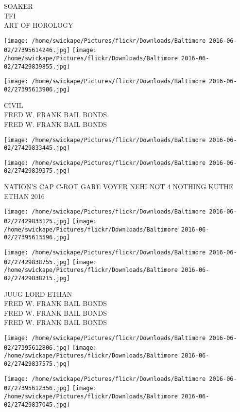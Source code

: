\documentclass[10pt,letterpaper]{article}
\begin{document}
SOAKER\\
TFI\\
ART OF HOROLOGY
\pagebreak

\texttt{[image: /home/swickape/Pictures/flickr/Downloads/Baltimore 2016-06-02/27395614246.jpg]}
\texttt{[image: /home/swickape/Pictures/flickr/Downloads/Baltimore 2016-06-02/27429839855.jpg]}

\vspace{0.25in}
\texttt{[image: /home/swickape/Pictures/flickr/Downloads/Baltimore 2016-06-02/27395613906.jpg]}

CIVIL\\
FRED W. FRANK BAIL BONDS\\
FRED W. FRANK BAIL BONDS
\pagebreak

\texttt{[image: /home/swickape/Pictures/flickr/Downloads/Baltimore 2016-06-02/27429833445.jpg]}

\vspace{0.25in}
\texttt{[image: /home/swickape/Pictures/flickr/Downloads/Baltimore 2016-06-02/27429839375.jpg]}

NATION'S CAP C{-}ROT GARE VOYER NEHI NOT 4 NOTHING KUTHE\\
ETHAN 2016
\pagebreak

\texttt{[image: /home/swickape/Pictures/flickr/Downloads/Baltimore 2016-06-02/27429833125.jpg]}
\texttt{[image: /home/swickape/Pictures/flickr/Downloads/Baltimore 2016-06-02/27395613596.jpg]}

\texttt{[image: /home/swickape/Pictures/flickr/Downloads/Baltimore 2016-06-02/27429838755.jpg]}
\texttt{[image: /home/swickape/Pictures/flickr/Downloads/Baltimore 2016-06-02/27429838215.jpg]}

JUUG LORD ETHAN\\
FRED W. FRANK BAIL BONDS\\
FRED W. FRANK BAIL BONDS\\
FRED W. FRANK BAIL BONDS
\pagebreak

\texttt{[image: /home/swickape/Pictures/flickr/Downloads/Baltimore 2016-06-02/27395612806.jpg]}
\texttt{[image: /home/swickape/Pictures/flickr/Downloads/Baltimore 2016-06-02/27429837575.jpg]}

\texttt{[image: /home/swickape/Pictures/flickr/Downloads/Baltimore 2016-06-02/27395612356.jpg]}
\texttt{[image: /home/swickape/Pictures/flickr/Downloads/Baltimore 2016-06-02/27429837045.jpg]}
\end{document}
